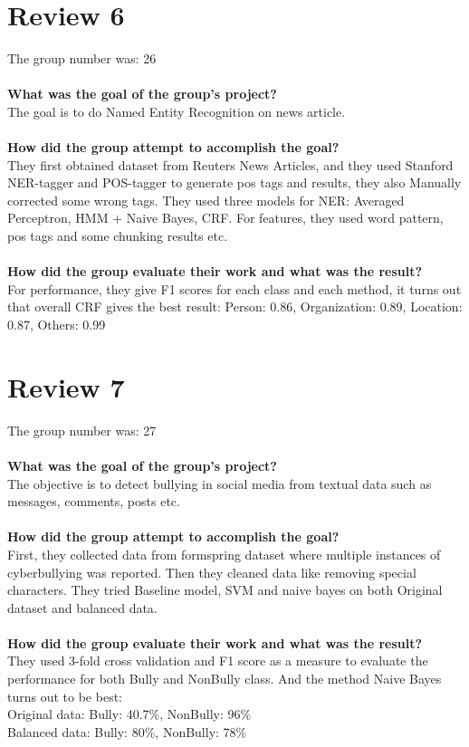 \documentclass[paper=a4, fontsize=11pt]{scrartcl} %
\numberwithin{equation}{section} %
\numberwithin{figure}{section} %
\numberwithin{table}{section} %
\begin{document}
\section{Review 6}
{The group number was: 26} \\
\ \\
{\bf What was the goal of the group's project?} \\
The goal is to do Named Entity Recognition on news article.\\
\ \\
{\bf How did the group attempt to accomplish the goal?}\\
They first obtained dataset from Reuters News Articles, and they used Stanford NER-tagger and POS-tagger to generate
pos tags and results, they also Manually corrected some wrong tags. They used three models for NER: Averaged Perceptron,
HMM + Naive Bayes, CRF.  For features, they used word pattern, pos tags and some chunking results etc.\\
\ \\
{\bf How did the group evaluate their work and what was the result?}\\
For performance, they give F1 scores for each class and each method, it turns out that overall CRF gives the best result: 
Person: 0.86, Organization: 0.89, Location: 0.87, Others: 0.99

\section{Review 7}
{The group number was: 27} \\
\ \\
{\bf What was the goal of the group's project?} \\
The objective is to detect bullying in social media from textual data such as messages, comments, posts etc.\\
\ \\
{\bf How did the group attempt to accomplish the goal?}\\
First, they collected data from formspring dataset where multiple instances of cyberbullying was reported. Then they
cleaned data like removing special characters. They tried Baseline model, SVM and naive bayes on both Original dataset
and balanced data.\\
\ \\
{\bf How did the group evaluate their work and what was the result?}\\
They used 3-fold cross validation and F1 score as a measure to evaluate the performance for both Bully and NonBully class. And 
the method Naive Bayes turns out to be best:\\
Original data: Bully: 40.7\%, NonBully: 96\% \\
Balanced data: Bully: 80\%, NonBully: 78\%
\end{document}
